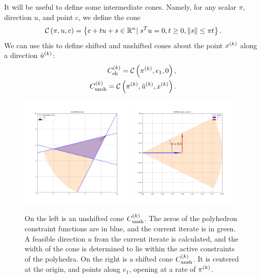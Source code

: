 \documentclass{article}
\begin{document}
% 

It will be useful to define some intermediate cones.
Namely, for any scalar $\pi$, direction $u$, and point $c$, we define the cone
\begin{align}
\mathcal C\left(\pi, u, c\right) = \left\{c + t u + s \in \mathbb R^n | \; s^Tu= 0, t \ge 0, \|s\| \le \pi t\right\}.
\end{align}
We can use this to define shifted and unshifted cones about the point $x^{(k)}$ along a direction ${{{\hat u}^{(k)}}}$:
\begin{align}
{C^{(k)}_{\textrm{sh}}} = \mathcal C\left(\pi^{(k)}, e_1, 0\right), \label{defineshiftedcone} \\
{C^{(k)}_{\textrm{unsh}}} = \mathcal C\left(\pi^{(k)}, {{{\hat u}^{(k)}}}, x^{(k)}\right). \label{defineunshiftedcone}
\end{align}


\begin{figure}[ht]
    \centering
    \includegraphics[width=200px]{images/unshifted_cone.png}
    \includegraphics[width=200px]{images/shifted_cone.png}
    \caption[An example of the shifted and unshifted cones]
	{
		On the left is an unshifted cone ${C^{(k)}_{\textrm{unsh}}}$.
		The zeros of the polyhedron constraint functions are in blue, and the current iterate is in green.
		A feasible direction $u$ from the current iterate is calculated, and the width of the cone is determined to lie within the active constraints of the polyhedra.
		On the right is a shifted cone ${C^{(k)}_{\textrm{unsh}}}$.
		It is centered at the origin, and points along $e_1$, opening at a rate of $\pi^{(k)}$.
    }
    \label{linear_cones_images}
\end{figure}
\end{document}
